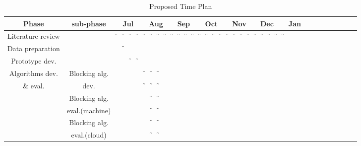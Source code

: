 \begin{table}
\caption{Proposed Time Plan}
\centering %
\begin{tabular}{|c|c|c|c|c|c|c|c|c|*{28}{c|}}
  \hline
   Phase									&	sub-phase				 &
   \multicolumn{4}{|c|}{Jul} & 
   \multicolumn{4}{|c|}{Aug} & 
   \multicolumn{4}{|c|}{Sep} & 
   \multicolumn{4}{|c|}{Oct} & 
   \multicolumn{4}{|c|}{Nov} & 
   \multicolumn{4}{|c|}{Dec} &
   \multicolumn{4}{|c|}{Jan} \\ [0.01ex]
   \hline
   Literature review						&								&
    \f&\f&\f&\f&\f&\f&\f&\f&\f&\f&\f&\f&\f&\f&\f&\f&\f&\f&\f&\f&\f&\f&\f&\f&\f&  &  &\\ [0.01ex] \hline

   Data preparation						&								&
      &\f&  &  &  &  &  &  &  &  &  &  &  &  &  &  &  &  &  &  &  &  &  &  &  &  &  &\\ [0.01ex] \hline
   Prototype dev.						&								&
      &  &\f&\f&  &  &  &  &  &  &  &  &  &  &  &  &  &  &  &  &  &  &  &  &  &  &  &\\ [0.01ex] \hline
   Algorithms dev. 								&	Blocking alg.		&		 
      &  &  &  &\f&\f&\f&  &  &  &  &  &  &  &  &  &  &  &  &  &  &  &  &  &  &  &  &\\ [0.01ex] 
   \& eval.										&	dev.		 		&		 
      &  &  &  &\f&\f&\f&  &  &  &  &  &  &  &  &  &  &  &  &  &  &  &  &  &  &  &  &\\ [0.01ex] \hline 
   												&	Blocking alg.		&		 
      &  &  &  &  &\f&\f&  &  &  &  &  &  &  &  &  &  &  &  &  &  &  &  &  &  &  &  &\\ [0.01ex] 
   											&	eval.(machine)		&		 
      &  &  &  &  &\f&\f&  &  &  &  &  &  &  &  &  &  &  &  &  &  &  &  &  &  &  &  &\\ [0.01ex] \hline
   												&	Blocking alg.		&		 
      &  &  &  &  &\f&\f&  &  &  &  &  &  &  &  &  &  &  &  &  &  &  &  &  &  &  &  &\\ [0.01ex] 
   											&	eval.(cloud)		&		 
      &  &  &  &  &\f&\f&  &  &  &  &  &  &  &  &  &  &  &  &  &  &  &  &  &  &  &  &\\ [0.01ex] \hline 


\end{tabular}
\end{table}

